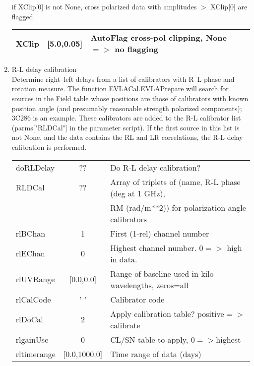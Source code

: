 \documentclass[11pt]{article}
\begin{document}
\begin{enumerate}
if XClip[0] is not None,  cross polarized data with amplitudes $>$ XClip[0] are flagged.
\begin{center}
\begin{tabular}{|l|c|l|}
\hline
XClip  & [5.0,0.05] & AutoFlag cross-pol clipping, None$=>$ no flagging \\
\hline
\end{tabular}
\end{center}
%
\item R-L  delay calibration\\
Determine right--left delays from a list of calibrators with R--L
phase and rotation measure.
The function EVLACal.EVLAPrepare will search for sources in the Field
table whose positions are those of calibrators with known position
angle (and presumably reasonable strength polarized components);
3C286 is an example.
These calibrators are added to the R-L calibrator list (parms["RLDCal"]
in the parameter script).
If the first source in this list is not None, and the data contains
the RL and LR correlations, the R-L delay calibration is performed. \\
\begin{center}
\begin{tabular}{|l|c|l|}
\hline
doRLDelay   & ?? &  Do R-L delay calibration?\\
RLDCal      & ?? &  Array of triplets of (name, R-L phase (deg at 1 GHz), \\
            &    &  RM (rad/m**2)) for polarization angle calibrators\\
rlBChan     & 1            & First (1-rel) channel number\\
rlEChan     & 0            & Highest channel number. $0=>$ high in data. \\
rlUVRange   &  [0.0,0.0]   & Range of baseline used in kilo wavelengths, zeros=all\\
rlCalCode   & '  '         & Calibrator code\\
rlDoCal     & 2            & Apply calibration table? positive$=>$calibrate\\
rlgainUse   & 0            & CL/SN table to apply, $0=>$highest\\
rltimerange & [0.0,1000.0] & Time range of data (days)\\

\end{tabular}
\end{center}
\end{enumerate}
\end{document}
